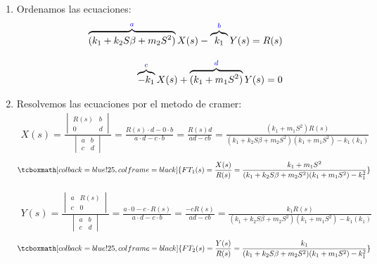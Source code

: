 \documentclass[12pt]{article}
\begin{document}
\begin{enumerate}
  \item Ordenamos las ecuaciones:
    \begin{eqnarray}
      \overbrace{(k_{1} + k_{2} S\beta + m_{2}S^{2})}^{\textcolor{blue}{a}}X(s) - \overbrace{k_{1}}^{\textcolor{blue}{b}}Y(s) = R(s) \\[3mm]
      \overbrace{-k_{1}}^{\textcolor{blue}{c}}X(s) + \overbrace{(k_{1} + m_{1}S^{2})}^{\textcolor{blue}{d}}Y(s) = 0
    \end{eqnarray}

  \item Resolvemos las ecuaciones por el metodo de cramer:
    \begin{eqnarray*}
      X(s)=\frac{
      \begin{vmatrix}
        R(s) & b\\
        0 & d
      \end{vmatrix}}
      {\begin{vmatrix}
        a & b\\
        c & d
      \end{vmatrix}}
      =\frac{R(s)\cdot d - 0\cdot b}{a\cdot d - c\cdot b}=\frac{R(s)d}{ad - cb}
      =\frac{(k_{1}+m_{1}S^{2})R(s)}{(k_{1}+k_{2}S\beta+m_{2}S^{2})(k_{1}+m_{1}S^{2}) - k_{1}(k_{1})}
    \end{eqnarray*}
    \begin{eqnarray*}
      \tcboxmath[colback=blue!25,colframe=black]
      {FT_{1}(s)=\frac{X(s)}{R(s)}=\frac{k_{1}+m_{1}S^{2}}{(k_{1}+k_{2}S\beta+m_{2}S^{2})(k_{1}+m_{1}S^{2}) - k_{1}^{2}}}
    \end{eqnarray*}

    \begin{eqnarray*}
      Y(s)=\frac{
      \begin{vmatrix}
        a & R(s)\\
        c & 0
      \end{vmatrix}}
      {\begin{vmatrix}
        a & b\\
        c & d
      \end{vmatrix}}
      =\frac{a\cdot0 - c\cdot R(s)}{a\cdot d - c\cdot b}=\frac{-cR(s)}{ad - cb}
      =\frac{k_{1}R(s)}{(k_{1}+k_{2}S\beta+m_{2}S^{2})(k_{1}+m_{1}S^{2}) - k_{1}(k_{1})}
    \end{eqnarray*}
    \begin{eqnarray*}
      \tcboxmath[colback=blue!25,colframe=black]
      {FT_{2}(s)=\frac{Y(s)}{R(s)}=\frac{k_{1}}{(k_{1}+k_{2}S\beta+m_{2}S^{2})(k_{1}+m_{1}S^{2}) - k_{1}^{2}}}
    \end{eqnarray*}

\end{enumerate}
\end{document}
